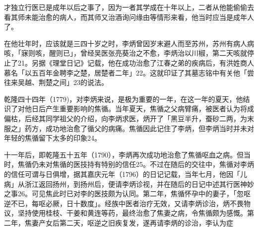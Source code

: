 \vfill
\begin{BookNotes}
\end{BookNotes}

\noindent 才独立行医已是成年以后之事了，因为一者其学成在十年以上，二者从他能偷偷去看其师未能治愈的病人，而其师又治酒询问缘由等情形来看，他当时应当是成年人了。

在他壮年时，应该就是三四十岁之时，李炳曾因岁末避人而至苏州，苏州有病人病咳，「寐则咳，醒则已」，曾经吴医张亮葵治之不愈，李炳治以川椒，第二天咳就停止了21。另据《理堂日记》记载，他在成功治愈了江春之弟的疾病后，有洪姓商人慕名「以五百年金聘李之楚，居楚者二年」22。这就印证了其墓志铭中有关他「尝往来吴越、荆楚之间」23的说法。

乾隆四十四年（1779)，对李炳来说，是极为重要的一年，在这一年的夏天，他结识了对他日后产生重要影响的焦循。当年夏天，焦循之父病臂痛，被医者认为将成偏枯，后经其同学祖父的介绍，向李炳求医，炳开了「黑豆半升，蚕砂二两，为末服之」药方，成功地治愈了循父的病痛。焦循因此记住了李炳，但李炳当时并未对年轻的焦循留下太多的印象24。

十一年后，即乾隆五十五年（1790），李炳再次成功地治愈了焦循呕血之病。但当时，焦循仍未对焦循的医技持有特别的信任25。不过在随后的交往中，焦循对李炳的信任可谓与日俱增，据其嘉庆元年（1796）的日记记载，当年七月，他因「儿病」从浙江返回扬州，到扬州后，便请李炳诊视，并在随后的日记中述其行医神妙之事26。可见焦此时已对李的医技颇为认同。第二年，焦循怀孕中的妻子，「忽呕逆不已，每呕必厥，日十数度」。经族中医者治疗无效，又请李炳诊治，炳不畏物议，坚持使用桂枝、干姜和黄连等药，最终治愈了焦妻之病，令焦循颇为感慨。第二年，焦妻产女后第二天，呕逆之旧疾复发，遂再请李炳的诊治，李认为症

\vfill
\begin{BookNotes}
\end{BookNotes}

